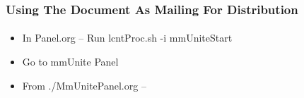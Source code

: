 \begin{comment}
*****  [[elisp:(org-cycle)][| ]]  [[elisp:(blee:ppmm:org-mode-toggle)][Nat]] [[elisp:(beginning-of-buffer)][Top]] [[elisp:(delete-other-windows)][(1)]] || /Frame/ *Label=UsingTheDocumentAsMailingForDistribution*  Using The Document As Mailing For Distribution ::  [[elisp:(org-cycle)][| ]]
\end{comment}

\begin{frame}[fragile,label=UsingTheDocumentAsMailingForDistribution]
    \frametitle{Using The Document As Mailing For Distribution}
    \framesubtitle{}

\begin{itemize}
\item In Panel.org -- Run  lcntProc.sh -i mmUniteStart 
\item Go to mmUnite Panel
\item From ./MmUnitePanel.org -- 
\end{itemize}



\end{frame}



\begin{comment}
*  [[elisp:(org-cycle)][| ]]  Local Vars  ::                  *Org-Mode And Emacs Specific Configurations*   [[elisp:(org-cycle)][| ]]
\end{comment}

